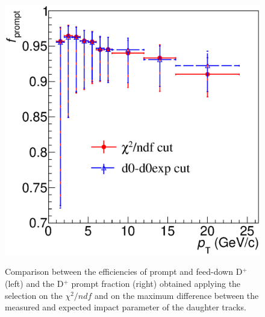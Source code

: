 \documentclass[b5paper,10pt,twoside,oldstyle,classica]{toptesi}
\begin{document}
\begin{figure}[tb]
\begin{center}
{\includegraphics[scale = 0.31]{PromptFrac_cutset1_cutsettopo.eps}}
\caption{Comparison between the efficiencies of prompt and feed-down D$^+$ (left) and the D$^+$ prompt fraction (right) obtained applying the selection on the $\chi^2/ndf$ and on the maximum difference between the measured and expected impact parameter of the daughter tracks.}
\label{KF_comptopo_2}
\end{center}
\end{figure} 
\end{document}
